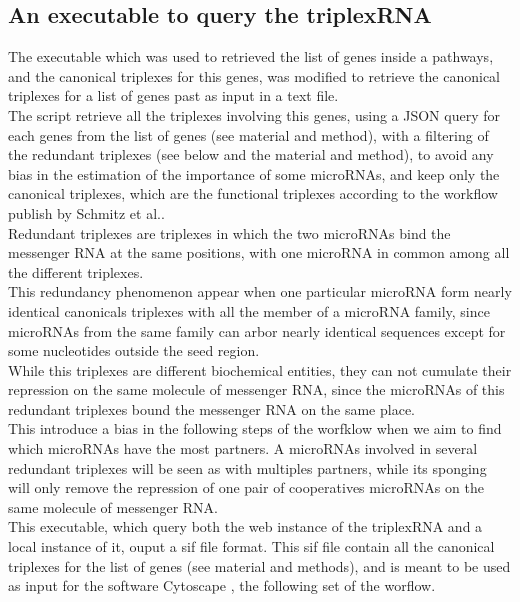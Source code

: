 \documentclass[a4paper,12pt]{report}
\begin{document}
\subsection{An executable to query the triplexRNA}

The executable which was used to retrieved the list of genes inside a pathways, and the canonical triplexes for this genes, was modified to retrieve the canonical triplexes for a list of genes past as input in a text file.\\

The script retrieve all the triplexes involving this genes, using a JSON query for each genes from the list of genes (see material and method), with a filtering of the redundant triplexes (see below and the material and method), to avoid any bias in the estimation of the importance of some microRNAs, and keep only the canonical triplexes, which are the functional triplexes according to the workflow publish by Schmitz et al.\cite{triplex}.\\

Redundant triplexes are triplexes in which the two microRNAs bind the messenger RNA at the same positions, with one microRNA in common among all the different triplexes.\\

This redundancy phenomenon appear when one particular microRNA form nearly identical canonicals triplexes with all the member of a microRNA family, since microRNAs from the same family can arbor nearly identical sequences except for some nucleotides outside the seed region.\\

While this triplexes are different biochemical entities, they can not cumulate their repression on the same molecule of messenger RNA, since the microRNAs of this redundant triplexes bound the messenger RNA on the same place.\\

This introduce a bias in the following steps of the worfklow when we aim to find which microRNAs have the most partners. A microRNAs involved in several redundant triplexes will be seen as with multiples partners, while its sponging will only remove the repression of one pair of cooperatives microRNAs on the same molecule of messenger RNA.\\

This executable, which query both the web instance of the triplexRNA and a local instance of it, ouput a sif file format. This sif file contain all the canonical triplexes for the list of genes (see material and methods), and is meant to be used as input for the software Cytoscape \cite{cytoscape}, the following set of the worflow.
\end{document}
